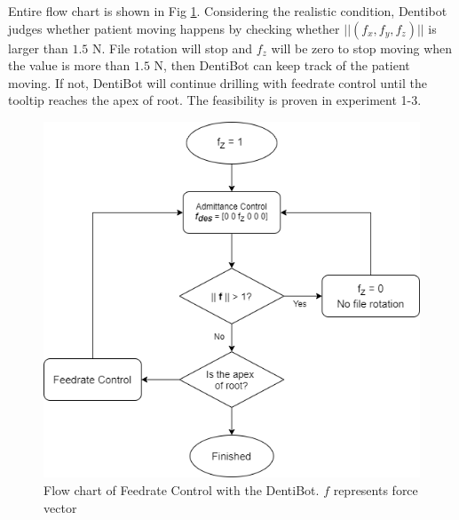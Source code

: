 \par
Entire flow chart is shown in Fig \ref{fig: feedrate_control_fc}. Considering the realistic condition, Dentibot judges whether patient moving happens by checking whether $||(f_x,f_y,f_z)||$ is larger than $1.5$ N. File rotation will stop and $f_z$ will be zero to stop moving when the value is more than $1.5$ N, then DentiBot can keep track of the patient moving. If not, DentiBot will continue drilling with feedrate control until the tooltip reaches the apex of root. The feasibility is proven in experiment 1-3.
\begin{figure}[htbp]
\begin{center}
\includegraphics[width= 1\linewidth]{Images/feedrate_control_flow_chart.png}
\caption{Flow chart of Feedrate Control with the DentiBot. $f$ represents force vector}
\label{fig: feedrate_control_fc}
\end{center}
\end{figure}

